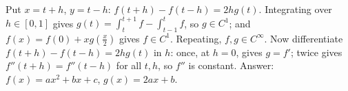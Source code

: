 \documentclass[11pt,a4paper]{article}
\begin{document}
 Put \(x=t+h\), \(y=t-h\): \(f(t+h)-f(t-h)=2hg(t)\). Integrating over \(h\in[0,1]\) gives \(g(t)=\int_t^{t+1}f-\int_{t-1}^tf\), so \(g\in C^1\); and \(f(x)=f(0)+xg(\frac x2)\) gives \(f\in C^1\). Repeating, \(f,g\in C^\infty\).
 Now differentiate \(f(t+h)-f(t-h)=2hg(t)\) in \(h\): once, at \(h=0\), gives \(g=f'\); twice gives \(f''(t+h)=f''(t-h)\) for all \(t,h\), so \(f''\) is constant.
 Answer: \(f(x)=ax^2+bx+c\), \(g(x)=2ax+b\).
\end{document}
